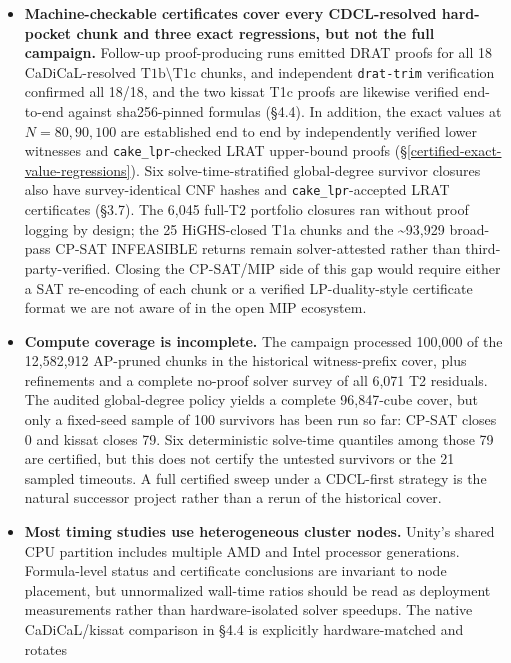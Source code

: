 \begin{itemize}
\tightlist
\item
  \textbf{Machine-checkable certificates cover every CDCL-resolved
  hard-pocket chunk and three exact regressions, but not the full campaign.}
  Follow-up proof-producing runs emitted DRAT
  proofs for all 18 CaDiCaL-resolved
  $\mathrm{T1b}\setminus\mathrm{T1c}$ chunks, and independent
  \texttt{drat-trim} verification confirmed all 18/18, and the two
  kissat T1c proofs are likewise verified end-to-end against
  sha256-pinned formulas (§4.4). In addition, the exact values at
  $N=80,90,100$ are established end to end by independently verified lower
  witnesses and \texttt{cake\_lpr}-checked LRAT upper-bound proofs
  (§\ref{certified-exact-value-regressions}). Six solve-time-stratified
  global-degree survivor closures also have survey-identical CNF hashes and
  \texttt{cake\_lpr}-accepted LRAT certificates (§3.7).
  The 6,045 full-T2 portfolio closures ran without proof logging by design;
  the 25 HiGHS-closed T1a chunks and the
  \textasciitilde{}93,929 broad-pass CP-SAT INFEASIBLE returns remain
  solver-attested rather than third-party-verified. Closing the CP-SAT/MIP
  side of this gap would require either a SAT re-encoding of each chunk or
  a verified LP-duality-style certificate format we are not aware of in
  the open MIP ecosystem.
\item
  \textbf{Compute coverage is incomplete.} The campaign processed
  100,000 of the 12,582,912 AP-pruned chunks in the historical witness-prefix
  cover, plus refinements and a complete no-proof solver survey of all
  6,071 T2 residuals. The audited global-degree policy yields a complete
  96,847-cube cover, but only a fixed-seed sample of 100 survivors has been
  run so far: CP-SAT closes 0 and kissat closes 79. Six deterministic
  solve-time quantiles among those 79 are certified, but this does not certify
  the untested survivors or the 21 sampled timeouts.
  A full certified sweep under a CDCL-first strategy is the natural successor
  project rather than a rerun of the historical cover.
\item
  \textbf{Most timing studies use heterogeneous cluster nodes.} Unity's
  shared CPU partition includes multiple AMD and Intel processor generations.
  Formula-level status and certificate conclusions are invariant to node
  placement, but unnormalized wall-time ratios should be read as deployment
  measurements rather than hardware-isolated solver speedups. The native
  CaDiCaL/kissat comparison in §4.4 is explicitly hardware-matched and rotates

\end{itemize}
